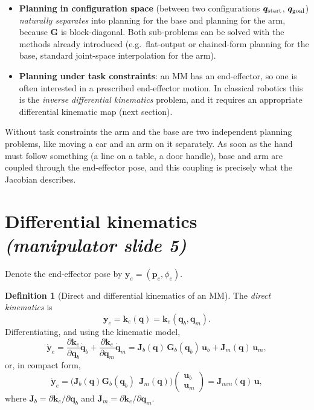 \documentclass[11pt,a4paper]{article}
\newcommand{\qbase}{\bm{q}_b}
\newcommand{\qarm}{\bm{q}_m}
\newcommand{\ubase}{\bm{u}_b}
\newcommand{\uarm}{\bm{u}_m}
\newcommand{\Gbase}{\bm{G}_b}
\newcommand{\Jbase}{\bm{J}_b}
\newcommand{\Jarm}{\bm{J}_m}
\newcommand{\Jmm}{\bm{J}_{mm}}
\newcommand{\ye}{\bm{y}_e}
\theoremstyle{plain}
\theoremstyle{definition}
\newtheorem{definition}[theorem]{Definition}
\theoremstyle{remark}
\begin{document}
\begin{itemize}[leftmargin=*]
\item \textbf{Planning in configuration space} (between two configurations $\bm q_{\rm start}$, $\bm q_{\rm goal}$) \emph{naturally separates} into planning for the base and planning for the arm, because $\bm G$ is block-diagonal. Both sub-problems can be solved with the methods already introduced (e.g.\ flat-output or chained-form planning for the base, standard joint-space interpolation for the arm).
\item \textbf{Planning under task constraints}: an MM has an end-effector, so one is often interested in a prescribed end-effector motion. In classical robotics this is the \emph{inverse differential kinematics} problem, and it requires an appropriate differential kinematic map (next section).
\end{itemize}

\begin{intuition}
Without task constraints the arm and the base are two independent planning problems, like moving a car and an arm on it separately. As soon as the hand must follow something (a line on a table, a door handle), base and arm are coupled through the end-effector pose, and this coupling is precisely what the Jacobian describes.
\end{intuition}

\section{Differential kinematics \emph{(manipulator slide 5)}}

Denote the end-effector pose by $\ye=(\bm p_e,\phi_e)$.

\begin{definition}[Direct and differential kinematics of an MM]
The \emph{direct kinematics} is
\[
\ye=\bm k_e(\bm q)=\bm k_e(\qbase,\qarm).
\]
Differentiating, and using the kinematic model,
\[
\dot{\bm y}_e=\frac{\partial\bm k_e}{\partial\qbase}\dot{\bm q}_b+\frac{\partial\bm k_e}{\partial\qarm}\dot{\bm q}_m
=\Jbase(\bm q)\,\Gbase(\qbase)\,\ubase+\Jarm(\bm q)\,\uarm ,
\]
or, in compact form,
\[
\dot{\bm y}_e=\bigl(\Jbase(\bm q)\Gbase(\qbase)\ \ \Jarm(\bm q)\bigr)\begin{pmatrix}\ubase\\ \uarm\end{pmatrix}=\Jmm(\bm q)\,\bm u,
\]
where $\Jbase=\partial\bm k_e/\partial\qbase$ and $\Jarm=\partial\bm k_e/\partial\qarm$.
\end{definition}
\end{document}
